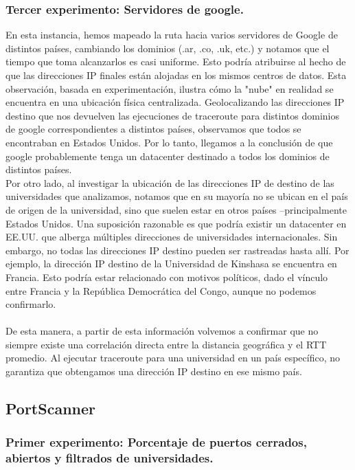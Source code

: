 \documentclass{article}
\begin{document}
    \subsubsection{Tercer experimento: Servidores de google.}
       En esta instancia, hemos mapeado la ruta hacia varios servidores de Google de distintos países, cambiando los dominios (.ar, .co, .uk, etc.) y notamos que el tiempo que toma alcanzarlos es casi uniforme. Esto podría atribuirse al hecho de que las direcciones IP finales están alojadas en los mismos centros de datos. Esta observación, basada en experimentación, ilustra cómo la "nube" en realidad se encuentra en una ubicación física centralizada. Geolocalizando las direcciones IP destino que nos devuelven las ejecuciones de traceroute para distintos dominios de google correspondientes a distintos países, observamos que todos se encontraban en Estados Unidos. Por lo tanto, llegamos a la conclusión de que google probablemente tenga un datacenter destinado a todos los dominios de distintos países. \\
       Por otro lado, al investigar la ubicación de las direcciones IP de destino de las universidades que analizamos, notamos que en su mayoría no se ubican en el país de origen de la universidad, sino que suelen estar en otros países –principalmente Estados Unidos. Una suposición razonable es que podría existir un datacenter en EE.UU. que alberga múltiples direcciones de universidades internacionales. Sin embargo, no todas las direcciones IP destino pueden ser rastreadas hasta allí. Por ejemplo, la dirección IP destino de la Universidad de Kinshasa se encuentra en Francia. Esto podría estar relacionado con motivos políticos, dado el vínculo entre Francia y la República Democrática del Congo, aunque no podemos confirmarlo.\\
       \\
       De esta manera, a partir de esta información volvemos a confirmar que no siempre existe una correlación directa entre la distancia geográfica y el RTT promedio. Al ejecutar traceroute para una universidad en un país específico, no garantiza que obtengamos una dirección IP destino en ese mismo país.


\subsection{PortScanner}

\subsubsection{Primer experimento: Porcentaje de puertos cerrados, abiertos y filtrados de universidades.}
\end{document}
